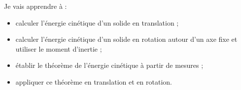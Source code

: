 \begin{minipage}[t]{0.485\linewidth}\RaggedRight\vspace{0pt}
\begin{tcolorbox}[enhanced,colback=cBlue!5,colframe=cBlue!5,arc=3mm,left=4mm,right=4mm,top=3mm,bottom=3mm,
  title={\sffamily\bfseries\color{cBlue}Objectifs du chapitre},detach title,before upper={\tcbtitle\par\smallskip},fontupper=\small\RaggedRight]
Je vais apprendre à :
\begin{itemize}
  \item calculer l’énergie cinétique d’un solide en translation ;
  \item calculer l’énergie cinétique d’un solide en rotation autour d’un axe fixe et utiliser le moment d’inertie ;
  \item établir le théorème de l’énergie cinétique à partir de mesures ;
  \item appliquer ce théorème en translation et en rotation.
\end{itemize}
\end{tcolorbox}
\end{minipage}\hfill
